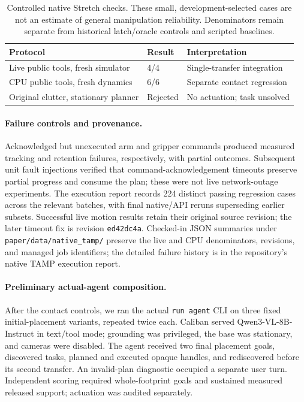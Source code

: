 \begin{table}[h]
\centering
\small
\begin{tabular}{lll}
\toprule
Protocol & Result & Interpretation \\
\midrule
Live public tools, fresh simulator & 4/4 & Single-transfer integration \\
CPU public tools, fresh dynamics & 6/6 & Separate contact regression \\
Original clutter, stationary planner & Rejected & No actuation; task unsolved \\
\bottomrule
\end{tabular}
\caption{Controlled native Stretch checks. These small, development-selected
cases are not an estimate of general manipulation reliability. Denominators
remain separate from historical latch/oracle controls and scripted baselines.}
\label{tab:native_tamp_acceptance}
\end{table}

\paragraph{Failure controls and provenance.}
Acknowledged but unexecuted arm and gripper commands produced measured tracking
and retention failures, respectively, with partial outcomes. Subsequent unit
fault injections verified that command-acknowledgement timeouts preserve partial
progress and consume the plan; these were not live network-outage experiments.
The execution report records 224 distinct passing regression cases across the
relevant batches, with final native/API reruns superseding earlier subsets.
Successful live motion results retain their original source revision; the later
timeout fix is revision \texttt{ed42dc4a}.
Checked-in JSON summaries under \texttt{paper/data/native\_tamp/} preserve the
live and CPU denominators, revisions, and managed job identifiers; the detailed
failure history is in the repository's native TAMP execution report.

\paragraph{Preliminary actual-agent composition.}
After the contact controls, we ran the actual \texttt{run agent} CLI on three
fixed initial-placement variants, repeated twice each. Caliban served
Qwen3-VL-8B-Instruct in text/tool mode; grounding was privileged, the base was
stationary, and cameras were disabled. The agent received two final placement
goals, discovered tasks, planned and executed opaque handles, and rediscovered
before its second transfer. An invalid-plan diagnostic occupied a separate user
turn. Independent scoring required whole-footprint goals and sustained measured
released support; actuation was audited separately.

